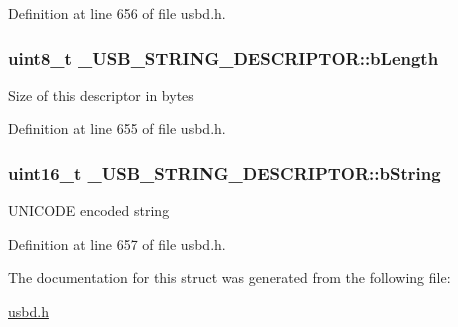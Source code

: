 Definition at line 656 of file usbd.\+h.

\subsubsection[{\texorpdfstring{b\+Length}{bLength}}]{\setlength{\rightskip}{0pt plus 5cm}uint8\+\_\+t \+\_\+\+U\+S\+B\+\_\+\+S\+T\+R\+I\+N\+G\+\_\+\+D\+E\+S\+C\+R\+I\+P\+T\+O\+R\+::b\+Length}\hypertarget{struct__USB__STRING__DESCRIPTOR_a27d5cd3019611e53d3588192d4c72b05}{}\label{struct__USB__STRING__DESCRIPTOR_a27d5cd3019611e53d3588192d4c72b05}
Size of this descriptor in bytes 

Definition at line 655 of file usbd.\+h.

\subsubsection[{\texorpdfstring{b\+String}{bString}}]{\setlength{\rightskip}{0pt plus 5cm}uint16\+\_\+t \+\_\+\+U\+S\+B\+\_\+\+S\+T\+R\+I\+N\+G\+\_\+\+D\+E\+S\+C\+R\+I\+P\+T\+O\+R\+::b\+String}\hypertarget{struct__USB__STRING__DESCRIPTOR_abbe1c4825365ecb9af165153435a6ef4}{}\label{struct__USB__STRING__DESCRIPTOR_abbe1c4825365ecb9af165153435a6ef4}
U\+N\+I\+C\+O\+DE encoded string 

Definition at line 657 of file usbd.\+h.



The documentation for this struct was generated from the following file\+:\begin{DoxyCompactItemize}
\item 
\hyperlink{usbd_8h}{usbd.\+h}\end{DoxyCompactItemize}
